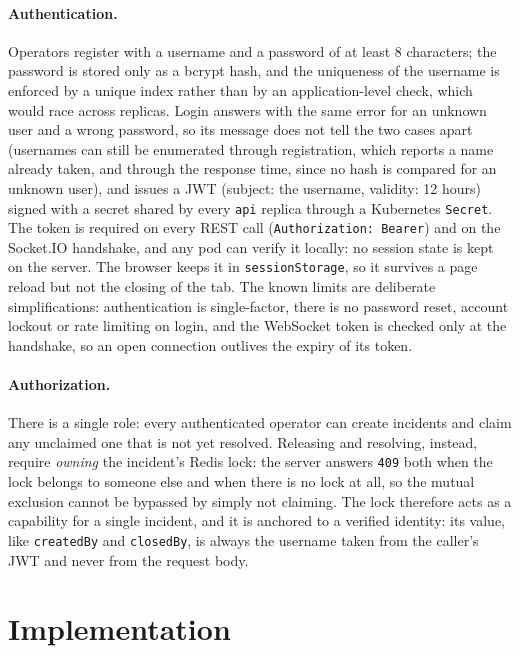 \documentclass{scrartcl}
\begin{document}
\paragraph{Authentication.} Operators register with a username and a password of at least 8 characters; the password is stored only as a bcrypt hash, and the uniqueness of the username is enforced by a unique index rather than by an application-level check, which would race across replicas. Login answers with the same error for an unknown user and a wrong password, so its message does not tell the two cases apart (usernames can still be enumerated through registration, which reports a name already taken, and through the response time, since no hash is compared for an unknown user), and issues a JWT (subject: the username, validity: 12 hours) signed with a secret shared by every \texttt{api} replica through a Kubernetes \texttt{Secret}. The token is required on every REST call (\texttt{Authorization: Bearer}) and on the Socket.IO handshake, and any pod can verify it locally: no session state is kept on the server. The browser keeps it in \texttt{sessionStorage}, so it survives a page reload but not the closing of the tab. The known limits are deliberate simplifications: authentication is single-factor, there is no password reset, account lockout or rate limiting on login, and the WebSocket token is checked only at the handshake, so an open connection outlives the expiry of its token.

\paragraph{Authorization.} There is a single role: every authenticated operator can create incidents and claim any unclaimed one that is not yet resolved. Releasing and resolving, instead, require \emph{owning} the incident's Redis lock: the server answers \texttt{409} both when the lock belongs to someone else and when there is no lock at all, so the mutual exclusion cannot be bypassed by simply not claiming. The lock therefore acts as a capability for a single incident, and it is anchored to a verified identity: its value, like \texttt{createdBy} and \texttt{closedBy}, is always the username taken from the caller's JWT and never from the request body.
 
\section{Implementation}\label{implementation}
\end{document}
